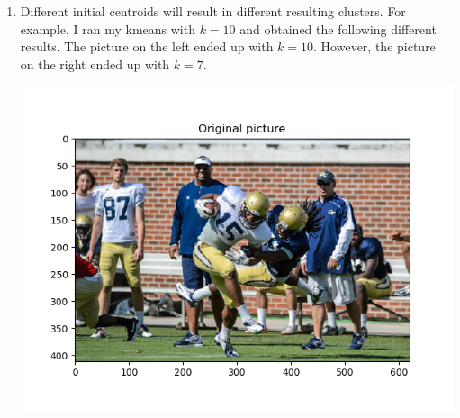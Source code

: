 \documentclass[twoside,10pt]{article}
\begin{document}
\begin{enumerate}
    \item Different initial centroids will result in different resulting clusters. For example, I ran my kmeans with $k = 10$ and obtained the following different results. The picture on the left ended up with $k=10$. However, the picture on the right ended up with $k=7$. 
        \begin{center}
        \includegraphics[scale = 0.5]{images/football.png}
        \end{center}

\end{enumerate}
\end{document}
